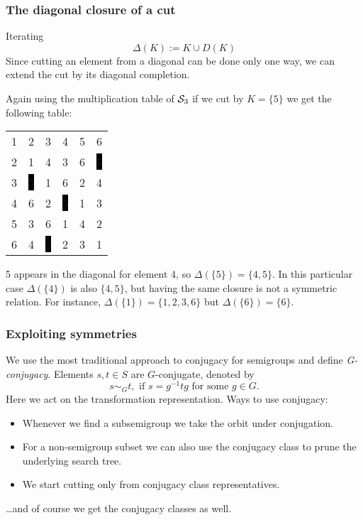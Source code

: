 \documentclass{beamer}
\newcommand{\cS}{{\cal S}}
\newcommand{\jump}{\vskip6pt}
\begin{document}
\begin{frame}\frametitle{The diagonal closure of a cut}
Iterating 
$$ \Delta(K):=K\cup D(K)$$
Since cutting an element from a diagonal can be done only one way, we can extend the cut by its diagonal completion.

Again using the multiplication table of $\cS_3$ if we cut by $K=\{5\}$ we get the following table:
\begin{center}
\begin{tabular}{@{}c@{}c@{}c@{}c@{}c@{}c@{}}
1&2&3&4&\color{lgr}5&6\\
2&1&4&3&\color{lgr}6&\color{white}\colorbox{black}{5}\\
3&\color{white}\colorbox{black}{5}&1&6&\color{lgr}2&4\\
4&6&2&\color{white}\colorbox{black}{5}&\color{lgr}1&3\\
\color{lgr}5&\color{lgr}3&\color{lgr}6&\color{lgr}1&\color{lgr}4&\color{lgr}2\\
6&4&\color{white}\colorbox{black}{5}&2&\color{lgr}3&1\\
\end{tabular}
\end{center}
5 appears in the diagonal for element 4, so $\Delta(\{5\})=\{4,5\}$. In this particular case $\Delta(\{4\})$ is also $\{4,5\}$, but having the same closure is not a symmetric relation. For instance, $\Delta(\{1\})=\{1,2,3,6\}$ but $\Delta(\{6\})=\{6\}$. 

\end{frame}

\begin{frame}\frametitle{Exploiting symmetries}
We use the most traditional approach to conjugacy for semigroups  and define \emph{G-conjugacy}. Elements $s,t\in S$ are $G$-conjugate, denoted by
$$s\sim_G t, \text{ if } s=g^{-1}tg \text{ for some } g\in G.$$ 
\jump
Here we act on the transformation representation.
\jump
Ways to use conjugacy:
\begin{itemize}
\item Whenever we find a subsemigroup we take the orbit under conjugation.
\item For a non-semigroup subset we can also use the conjugacy class to prune the underlying search tree. 
\item We start cutting only from conjugacy class representatives.
\end{itemize}
\ldots and of course we get the conjugacy classes as well.
\end{frame}
\end{document}
